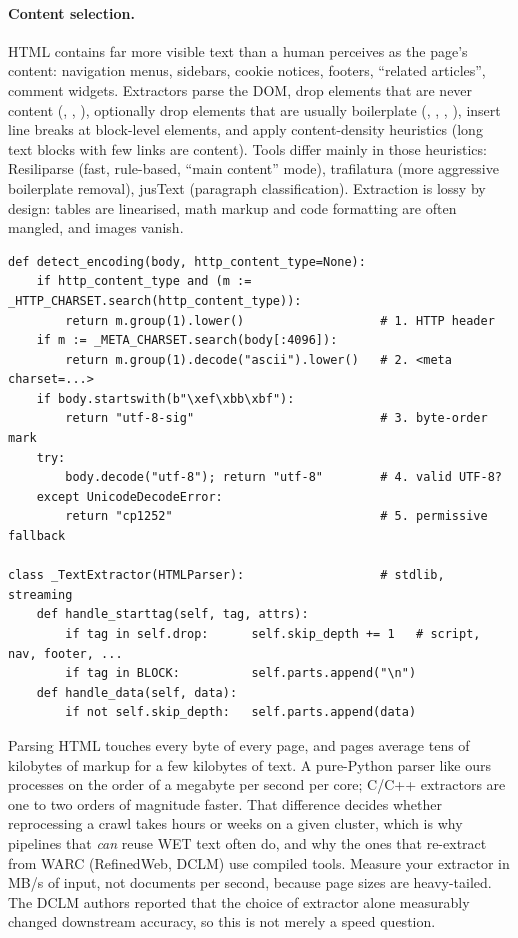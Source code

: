 \paragraph{Content selection.} HTML contains far more visible text than a human perceives as the
page's content: navigation menus, sidebars, cookie notices, footers, ``related articles'', comment
widgets. Extractors parse the DOM, drop elements that are never content (,
, ), optionally drop elements that are usually boilerplate (,
, , ), insert line breaks at block-level elements, and
apply content-density heuristics (long text blocks with few links are content). Tools differ
mainly in those heuristics: Resiliparse (fast, rule-based, ``main content'' mode), trafilatura
(more aggressive boilerplate removal), jusText (paragraph classification). Extraction is
lossy by design: tables are linearised, math markup and code formatting are often mangled, and
images vanish.

\begin{lstlisting}[caption={Charset cascade and a DOM-walking extractor (abridged from \code{llmsys/datapipe/extract.py}).},label={lst:data:extract}]
def detect_encoding(body, http_content_type=None):
    if http_content_type and (m := _HTTP_CHARSET.search(http_content_type)):
        return m.group(1).lower()                   # 1. HTTP header
    if m := _META_CHARSET.search(body[:4096]):
        return m.group(1).decode("ascii").lower()   # 2. <meta charset=...>
    if body.startswith(b"\xef\xbb\xbf"):
        return "utf-8-sig"                          # 3. byte-order mark
    try:
        body.decode("utf-8"); return "utf-8"        # 4. valid UTF-8?
    except UnicodeDecodeError:
        return "cp1252"                             # 5. permissive fallback

class _TextExtractor(HTMLParser):                   # stdlib, streaming
    def handle_starttag(self, tag, attrs):
        if tag in self.drop:      self.skip_depth += 1   # script, nav, footer, ...
        if tag in BLOCK:          self.parts.append("\n")
    def handle_data(self, data):
        if not self.skip_depth:   self.parts.append(data)
\end{lstlisting}

\begin{systemslens}
Parsing HTML touches every byte of every page, and pages average tens of kilobytes of markup
for a few kilobytes of text. A pure-Python parser like ours processes on the order of a
megabyte per second per core; C/C++ extractors are one to two orders of magnitude faster. That
difference decides whether reprocessing a crawl takes hours or weeks on a given cluster, which is
why pipelines that \emph{can} reuse WET text often do, and why the ones that re-extract from WARC
(RefinedWeb, DCLM) use compiled tools. Measure your extractor in MB/s of input, not documents per
second, because page sizes are heavy-tailed. The DCLM authors reported that the choice of extractor alone
measurably changed downstream accuracy, so this is not merely a speed question.
\end{systemslens}

